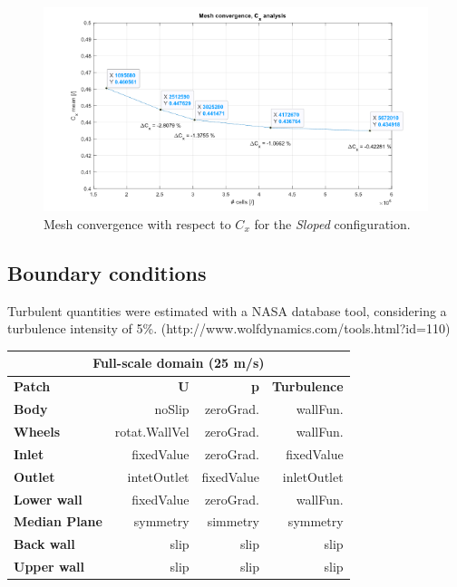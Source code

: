 \documentclass{elbioimp2}
\begin{document}
\begin{figure}[htp]
  \centering
  \includegraphics[width=0.9\columnwidth]{covergence.png}
  \caption{Mesh convergence with respect to $C_x$ for the \emph{Sloped} configuration.\label{convergence}}
\end{figure}

\subsection{Boundary conditions}
Turbulent quantities were estimated with a NASA database tool, considering a turbulence intensity of 5\%. (http://www.wolfdynamics.com/tools.html?id=110)\\

\begin{tabular}{|l|r|r|r|}
\hline
\multicolumn{4}{|c|}{\textbf{Full-scale domain (25 m/s)}} \\
\hline
\textbf{Patch} & \textbf{U} & \textbf{p} & \textbf{Turbulence} \\
\hline
\textbf{Body} & noSlip & zeroGrad. & wallFun. \\
\textbf{Wheels} & rotat.WallVel & zeroGrad. & wallFun. \\
\textbf{Inlet} & fixedValue & zeroGrad. & fixedValue \\
\textbf{Outlet} & intetOutlet & fixedValue & inletOutlet \\
\textbf{Lower wall} & fixedValue & zeroGrad. & wallFun. \\
\textbf{Median Plane} & symmetry & simmetry & symmetry \\
\textbf{Back wall} & slip & slip & slip \\
\textbf{Upper wall} & slip & slip & slip \\
\hline
\end{tabular} \\
\end{document}
